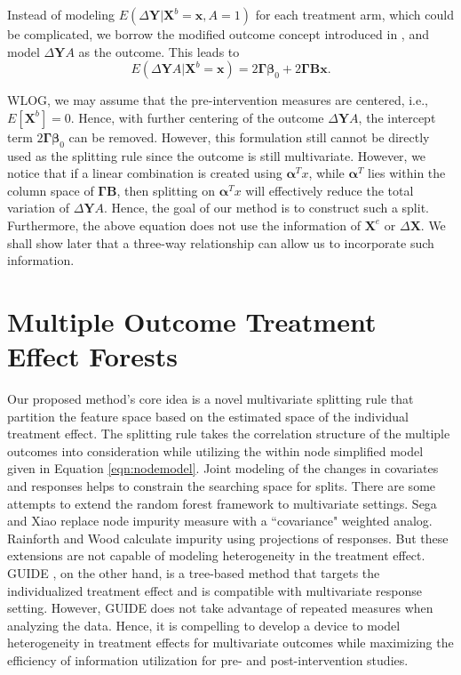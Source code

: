\documentclass[smallextended]{svjour3}
\begin{document}
Instead of modeling $E(\Delta \bm{Y}|\bm X^b = \bm x, A = 1)$ for each treatment arm, which could be complicated, we borrow the modified outcome concept introduced in \citep{tian2014simple}, and model $\Delta \bm{Y} A$ as the outcome. This leads to
\begin{equation}
E(\Delta \bm Y A | \bm X^b = \bm x) = 2 \bm \Gamma \boldsymbol \beta_0 + 2 \bm \Gamma \bm B \bm x. \label{eqn:nodemodel}
\end{equation}

WLOG, we may assume that the pre-intervention measures are centered, i.e., $E[\bm X^b] = 0$. Hence, with further centering of the outcome $\Delta \bm Y A$, the intercept term $2 \bm \Gamma \boldsymbol \beta_0$ can be removed. However, this formulation still cannot be directly used as the splitting rule since the outcome is still multivariate. However, we notice that if a linear combination is created using $\bm \alpha^T x$, while $\bm \alpha^T$ lies within the column space of $\bm \Gamma \bm B$, then splitting on $\bm \alpha^T x$ will effectively reduce the total variation of $\Delta \bm Y A$. Hence, the goal of our method is to construct such a split. Furthermore, the above equation does not use the information of $\bm X^e$ or $\Delta \bm X$. We shall show later that a three-way relationship can allow us to incorporate such information. 

\section{Multiple Outcome Treatment Effect Forests}\label{MOTE}
Our proposed method's core idea is a novel multivariate splitting rule that partition the feature space based on the estimated space of the individual treatment effect. The splitting rule takes the correlation structure of the multiple outcomes into consideration while utilizing the within node simplified model given in Equation \eqref{eqn:nodemodel}. Joint modeling of the changes in covariates and responses helps to constrain the searching space for splits. There are some attempts to extend the random forest framework to multivariate settings. Sega and Xiao \citep{Sega2011} replace node impurity measure with a ``covariance" weighted analog. Rainforth and Wood \citep{Rainforth2015} calculate impurity using projections of responses. But these extensions are not capable of modeling heterogeneity in the treatment effect. GUIDE \citep{Loh2015}, on the other hand, is a tree-based method that targets the individualized treatment effect and is compatible with multivariate response setting. However, GUIDE does not take advantage of repeated measures when analyzing the data. Hence, it is compelling to develop a device to model heterogeneity in treatment effects for multivariate outcomes while maximizing the efficiency of information utilization for pre- and post-intervention studies.
\end{document}
